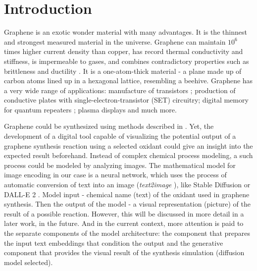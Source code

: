 \documentclass[runningheads]{llncs}
\begin{document}
\section{Introduction}
Graphene is an exotic wonder material with many advantages. It is the thinnest and strongest measured material in the universe. Graphene can maintain $10^{6}$ times higher current density than copper, has record thermal conductivity and stiffness, is impermeable to gases, and combines contradictory properties such as brittleness and ductility \cite{GrapheneDefinition}. It is a one-atom-thick material - a plane made up of carbon atoms lined up in a hexagonal lattice, resembling a beehive. Graphene has a very wide range of applications: manufacture of transistors \cite{GrapheneUseCases}; production of conductive plates with single-electron-transistor (SET) circuitry; digital memory for quantum repeaters \cite{GrapheneQuatumComputing}; plasma displays \cite{GraphenePlasmaDisplays} and much more.
\par
Graphene could be synthesized using methods described in \cite{GrapheneSynthesisVU,GICSynthesisVU}.
Yet, the development of a digital tool capable of visualizing the potential output of a graphene synthesis reaction using a selected oxidant could give an insight into the expected result beforehand. Instead of complex chemical process modeling, a such process could be modeled by analyzing images. The mathematical model for image encoding in our case is a neural network, which uses the process of automatic conversion of text into an image (\textit{text2image} \cite{text2image}), like Stable Diffusion or DALL-E 2 \cite{LatentDiffusion,DALLE}. Model input - chemical name (text) of the oxidant used in graphene synthesis. Then the output of the model - a visual representation (picture) of the result of a possible reaction. However, this will be discussed in more detail in a later work, in the future. And in the current context, more attention is paid to the separate components of the model architecture: the component that prepares the input text embeddings that condition the output and the generative component that provides the visual result of the synthesis simulation (diffusion model selected).
\par
\end{document}
